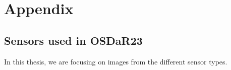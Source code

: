 \documentclass[Master,MDS,english]{BASE/twbook} %
\begin{document}
\clearpage

\listoffigures                                                   %
\clearpage

\listoftables                                                    %
\clearpage

    
    
    

\clearpage


\appendix
\chapter{Appendix}

\section{Sensors used in OSDaR23} \label{app:sensors}

In this thesis, we are focusing on images from the different sensor types. 
\end{document}
